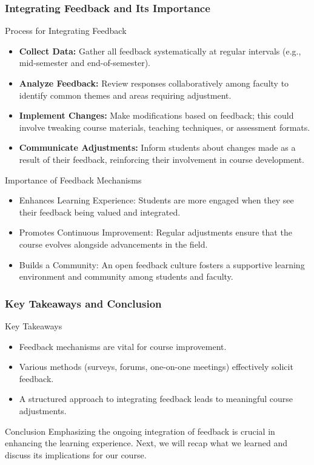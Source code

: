 \documentclass[aspectratio=169]{beamer}
\begin{document}
\begin{frame}[fragile]
    \frametitle{Integrating Feedback and Its Importance}
    \begin{block}{Process for Integrating Feedback}
        \begin{itemize}
            \item \textbf{Collect Data:} Gather all feedback systematically at regular intervals (e.g., mid-semester and end-of-semester).
            \item \textbf{Analyze Feedback:} Review responses collaboratively among faculty to identify common themes and areas requiring adjustment.
            \item \textbf{Implement Changes:} Make modifications based on feedback; this could involve tweaking course materials, teaching techniques, or assessment formats.
            \item \textbf{Communicate Adjustments:} Inform students about changes made as a result of their feedback, reinforcing their involvement in course development.
        \end{itemize}
    \end{block}
    
    \begin{block}{Importance of Feedback Mechanisms}
        \begin{itemize}
            \item Enhances Learning Experience: Students are more engaged when they see their feedback being valued and integrated.
            \item Promotes Continuous Improvement: Regular adjustments ensure that the course evolves alongside advancements in the field.
            \item Builds a Community: An open feedback culture fosters a supportive learning environment and community among students and faculty.
        \end{itemize}
    \end{block}
\end{frame}

\begin{frame}[fragile]
    \frametitle{Key Takeaways and Conclusion}
    \begin{block}{Key Takeaways}
        \begin{itemize}
            \item Feedback mechanisms are vital for course improvement.
            \item Various methods (surveys, forums, one-on-one meetings) effectively solicit feedback.
            \item A structured approach to integrating feedback leads to meaningful course adjustments.
        \end{itemize}
    \end{block}
    
    \begin{block}{Conclusion}
        Emphasizing the ongoing integration of feedback is crucial in enhancing the learning experience. Next, we will recap what we learned and discuss its implications for our course.
    \end{block}
\end{frame}
\end{document}
